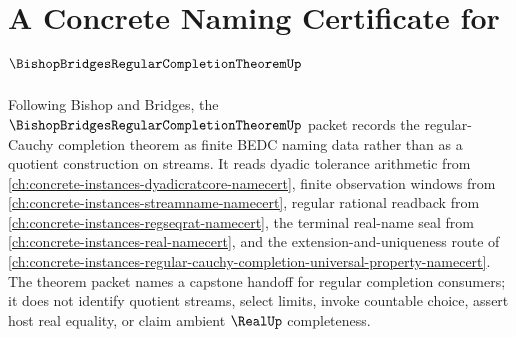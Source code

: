 \chapter{A Concrete Naming Certificate for $\BishopBridgesRegularCompletionTheoremUp$}
\label{ch:concrete-instances-bishop-bridges-regular-completion-theorem-namecert}

Following Bishop and Bridges, the $\BishopBridgesRegularCompletionTheoremUp$ packet records the regular-Cauchy completion theorem as finite BEDC naming data rather than as a quotient construction on streams. It reads dyadic tolerance arithmetic from \autoref{ch:concrete-instances-dyadicratcore-namecert}, finite observation windows from \autoref{ch:concrete-instances-streamname-namecert}, regular rational readback from \autoref{ch:concrete-instances-regseqrat-namecert}, the terminal real-name seal from \autoref{ch:concrete-instances-real-namecert}, and the extension-and-uniqueness route of \autoref{ch:concrete-instances-regular-cauchy-completion-universal-property-namecert}. The theorem packet names a capstone handoff for regular completion consumers; it does not identify quotient streams, select limits, invoke countable choice, assert host real equality, or claim ambient $\RealUp$ completeness.

